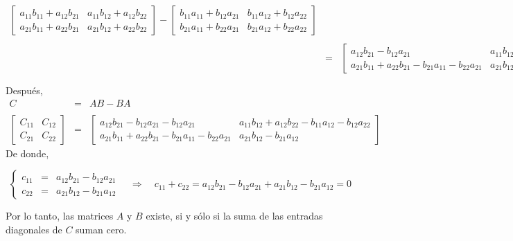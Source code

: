 \begin{enumerate}[1.]
$$\begin{array}{rcl}
	    \left[\begin{array}{rr}
		a_{11}b_{11}+a_{12}b_{21} & a_{11}b_{12}+a_{12}b_{22}\\
		a_{21}b_{11}+a_{22}b_{21} & a_{21}b_{12}+a_{22}b_{22}
	    \end{array}\right]
	    -
	    \left[\begin{array}{rr}
		b_{11}a_{11}+b_{12}a_{21} & b_{11}a_{12}+b_{12}a_{22}\\
		b_{21}a_{11}+b_{22}a_{21} & b_{21}a_{12}+b_{22}a_{22}
	    \end{array}\right]\\\\
	    &=& 
	    \left[\begin{array}{rr}
		    a_{12}b_{21}-b_{12}a_{21} & a_{11}b_{12}+a_{12}b_{22}-b_{11}a_{12}-b_{12}a_{22}\\
		    a_{21}b_{11}+a_{22}b_{21}-b_{21}a_{11}-b_{22}a_{21} &a_{21}b_{12}-b_{21}a_{12}
	    \end{array}\right]\\\\
	\end{array}
	$$
	Después,
	$$
	\begin{array}{rcl}
	    C &=& AB-BA\\\\ 
	    \left[\begin{array}{rr}
		C_{11} & C_{12}\\
		C_{21} & C_{22}
	    \end{array}\right]
		&=&
	    \left[\begin{array}{rr}
		    a_{12}b_{21}-b_{12}a_{21}-b_{12}a_{21} & a_{11}b_{12}+a_{12}b_{22}-b_{11}a_{12}-b_{12}a_{22}\\
		    a_{21}b_{11}+a_{22}b_{21}-b_{21}a_{11}-b_{22}a_{21} &a_{21}b_{12}-b_{21}a_{12}
	    \end{array}\right]
	\end{array}
	$$
	De donde,

	$$\left\{
	    \begin{array}{rcl}
		c_{11}&=&a_{12}b_{21}-b_{12}a_{21}\\
		c_{22}&=&a_{21}b_{12}-b_{21}a_{12}
	    \end{array}
	\right. 
	\quad \Rightarrow \quad 
	c_{11}+c_{22}=a_{12}b_{21}-b_{12}a_{21}+a_{21}b_{12}-b_{21}a_{12} = 0
	$$

	Por lo tanto, las matrices $A$ y $B$ existe, si y sólo si la suma de las entradas diagonales de $C$ suman cero.\\\\

\end{enumerate}



